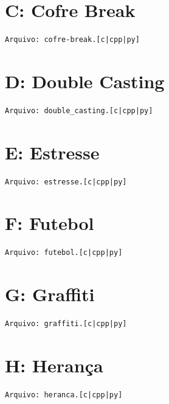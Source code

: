 \documentclass[12pt,oneside]{article} %
\begin{document}
\newpage
\section*{C: Cofre Break} %
\vspace{-0.52cm}
\noindent \begin{verbatim}Arquivo: cofre-break.[c|cpp|py]\end{verbatim}


\newpage
\section*{D: Double Casting} %
\vspace{-0.52cm}
\noindent \begin{verbatim}Arquivo: double_casting.[c|cpp|py]\end{verbatim}


\newpage
\section*{E: Estresse} %
\vspace{-0.52cm}
\noindent \begin{verbatim}Arquivo: estresse.[c|cpp|py]\end{verbatim}


\newpage
\section*{F: Futebol} %
\vspace{-0.52cm}
\noindent \begin{verbatim}Arquivo: futebol.[c|cpp|py]\end{verbatim}

\newpage

\section*{G: Graffiti} %
\vspace{-0.52cm}
\noindent \begin{verbatim}Arquivo: graffiti.[c|cpp|py]\end{verbatim}


\newpage
\section*{H: Herança} %
\vspace{-0.52cm}
\noindent \begin{verbatim}Arquivo: heranca.[c|cpp|py]\end{verbatim}

\end{document}
